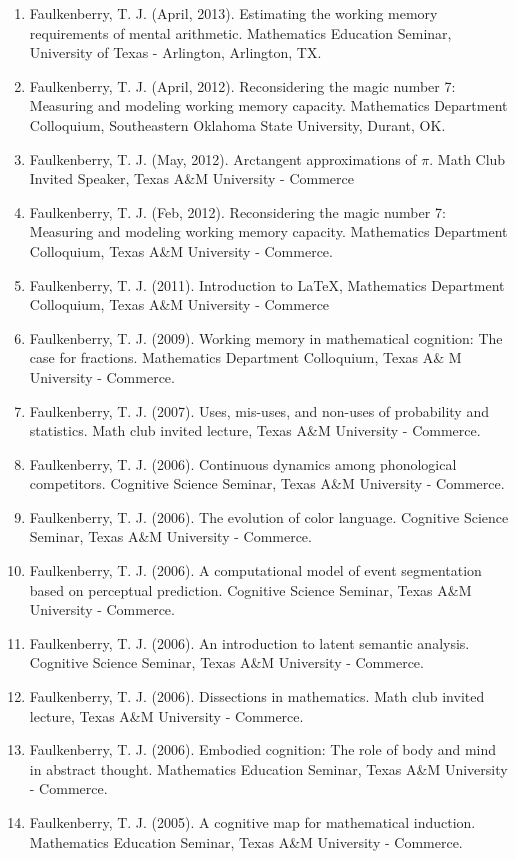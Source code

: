 \documentclass[article,10pt]{article}
\begin{document}
\begin{enumerate}
\item Faulkenberry, T. J. (April, 2013). Estimating the working memory requirements of mental arithmetic. Mathematics Education Seminar, University of Texas - Arlington, Arlington, TX.
\item Faulkenberry, T. J. (April, 2012). Reconsidering the magic number 7: Measuring and modeling working memory capacity. Mathematics Department Colloquium, Southeastern Oklahoma State University, Durant, OK.
\item Faulkenberry, T. J. (May, 2012). Arctangent approximations of \(\pi\). Math Club Invited Speaker, Texas A\&M University - Commerce
\item Faulkenberry, T. J. (Feb, 2012). Reconsidering the magic number 7: Measuring and modeling working memory capacity. Mathematics Department Colloquium, Texas A\&M University - Commerce.
\item Faulkenberry, T. J. (2011). Introduction to \LaTeX{}, Mathematics Department Colloquium, Texas A\&M University - Commerce
\item Faulkenberry, T. J. (2009). Working memory in mathematical cognition: The case for fractions. Mathematics Department Colloquium, Texas A\& M University - Commerce.
\item Faulkenberry, T. J. (2007). Uses, mis-uses, and non-uses of probability and statistics. Math club invited lecture, Texas A\&M University - Commerce.
\item Faulkenberry, T. J. (2006). Continuous dynamics among phonological competitors. Cognitive Science Seminar, Texas A\&M University - Commerce.
\item Faulkenberry, T. J. (2006). The evolution of color language. Cognitive Science Seminar, Texas A\&M University - Commerce.
\item Faulkenberry, T. J. (2006). A computational model of event segmentation based on perceptual prediction. Cognitive Science Seminar, Texas A\&M University - Commerce.
\item Faulkenberry, T. J. (2006). An introduction to latent semantic analysis. Cognitive Science Seminar, Texas A\&M University - Commerce.
\item Faulkenberry, T. J. (2006). Dissections in mathematics. Math club invited lecture, Texas A\&M University - Commerce.
\item Faulkenberry, T. J. (2006). Embodied cognition: The role of body and mind in abstract thought. Mathematics Education Seminar, Texas A\&M University - Commerce.
\item Faulkenberry, T. J. (2005). A cognitive map for mathematical induction. Mathematics Education Seminar, Texas A\&M University - Commerce.

\end{enumerate}
\end{document}
